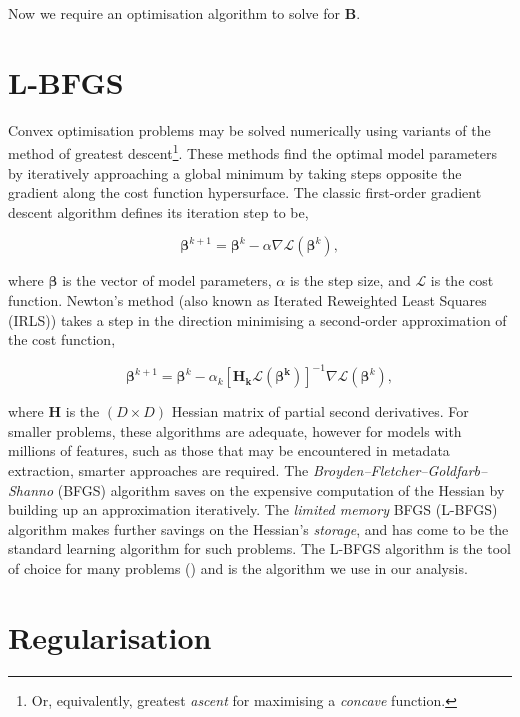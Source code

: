 Now we require an optimisation algorithm to solve for $\mathbf{B}$.

\section{L-BFGS}
\label{sec:lbfgs}

Convex optimisation problems may be solved numerically using variants of the method of greatest descent\footnote{Or, equivalently, greatest \emph{ascent} for maximising a \emph{concave} function.}. These methods find the optimal model parameters by iteratively approaching a global minimum by taking steps opposite the gradient along the cost function hypersurface. The classic first-order gradient descent algorithm defines its iteration step to be,

\begin{equation}
\boldsymbol\beta^{k+1} = \boldsymbol\beta^{k} - \alpha\nabla\mathcal{L}(\boldsymbol\beta^{k}),
\label{eq:gd}
\end{equation}

where $\boldsymbol\beta$ is the vector of model parameters, $\alpha$ is the step size, and $\mathcal{L}$ is the cost function. Newton's method (also known as Iterated Reweighted Least Squares (IRLS)) takes a step in the direction minimising a second-order approximation of the cost function,

\begin{equation}
\boldsymbol\beta^{k+1} = \boldsymbol\beta^{k} - \alpha_k [\mathbf{H_k\mathcal{L}(\boldsymbol\beta^{k})}]^{-1}\nabla\mathcal{L}(\boldsymbol\beta^{k}),
\label{eq:newton}
\end{equation}

where $\mathbf{H}$ is the $(D \times D)$ Hessian matrix of partial second derivatives. For smaller problems, these algorithms are adequate, however for models with millions of features, such as those that may be encountered in metadata extraction, smarter approaches are required. The \emph{Broyden--Fletcher--Goldfarb--Shanno} (BFGS) algorithm saves on the expensive computation of the Hessian by building up an approximation iteratively. The \emph{limited memory} BFGS (L-BFGS) algorithm makes further savings on the Hessian's \emph{storage}, and has come to be the standard learning algorithm for such problems. The L-BFGS algorithm is the tool of choice for many problems (\cite{murphy2012machine}) and is the algorithm we use in our analysis.

\section{Regularisation}

